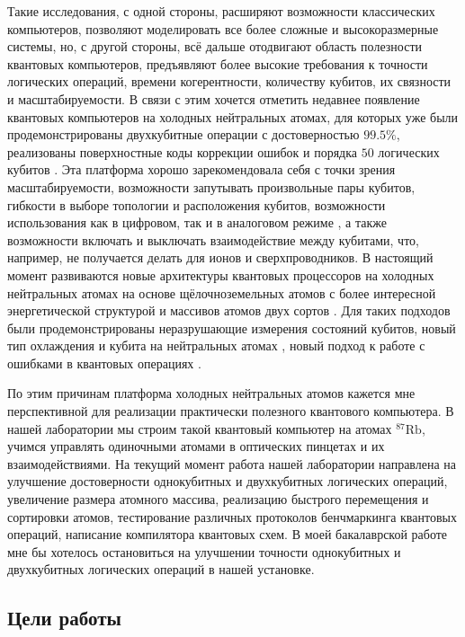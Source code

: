 Такие исследования, с одной стороны, расширяют возможности классических компьютеров, позволяют моделировать все более сложные и высокоразмерные системы, но, с другой стороны, всё дальше отодвигают область полезности квантовых компьютеров, предъявляют более высокие требования к точности логических операций, времени когерентности, количеству кубитов, их связности и масштабируемости. В связи с этим хочется отметить недавнее появление квантовых компьютеров на холодных нейтральных атомах, для которых уже были продемонстрированы двухкубитные операции с достоверностью $99.5\%$, реализованы поверхностные коды коррекции ошибок и порядка $50$ логических кубитов \cite{Bluvstein:2024aa}. Эта платформа хорошо зарекомендовала себя с точки зрения масштабируемости, возможности запутывать произвольные пары кубитов, гибкости в выборе топологии и расположения кубитов, возможности использования как в цифровом, так и в аналоговом режиме \cite{Ebadi_2021}, а также возможности включать и выключать взаимодействие между кубитами, что, например, не получается делать для ионов и сверхпроводников. В настоящий момент развиваются новые архитектуры квантовых процессоров на холодных нейтральных атомах на основе щёлочноземельных атомов с более интересной энергетической структурой \cite{ErasureCooling,Madjarov:2020aa,Ma:2023aa} и массивов атомов двух сортов \cite{TwoSpeciesArray}. Для таких подходов были продемонстрированы неразрушающие измерения состояний кубитов, новый тип охлаждения и кубита на нейтральных атомах \cite{ErasureCooling}, новый подход к работе с ошибками в квантовых операциях \cite{ErasureCooling,Ma:2023aa,TwoSpeciesArray}. 

По этим причинам платформа холодных нейтральных атомов кажется мне перспективной для реализации практически полезного квантового компьютера. В нашей лаборатории мы строим такой квантовый компьютер на атомах $^{87}\text{Rb}$, учимся управлять одиночными атомами в оптических пинцетах и их взаимодействиями. На текущий момент работа нашей лаборатории направлена на улучшение достоверности однокубитных и двухкубитных логических операций, увеличение размера атомного массива, реализацию быстрого перемещения и сортировки атомов, тестирование различных протоколов бенчмаркинга квантовых операций, написание компилятора квантовых схем. В моей бакалаврской работе мне бы хотелось остановиться на улучшении точности однокубитных и двухкубитных логических операций в нашей установке. 

\subsection{Цели работы}

